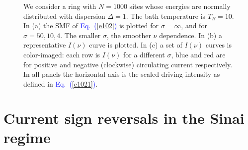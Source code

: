 \documentclass[aps,pre,floats,floatfix,twocolumn]{revtex4}
\newcommand{\Eq}[1]{\textcolor{blue}{Eq.\!\!~(\ref{#1})}}
\begin{document}
\begin{figure}
\caption{
We consider a ring with ${N=1000}$ sites whose energies 
are normally distributed with dispersion ${\Delta=1}$.
The bath temperature is $T_B=10$. 
In (a) the SMF of \Eq{e102} is plotted for $\sigma=\infty$, 
and for $\sigma=50,10,4$. The smaller $\sigma$, 
the smoother $\nu$ dependence.
In (b) a representative $I(\nu)$ curve is plotted.
In (c) a set of $I(\nu)$ curves is color-imaged:
each row is $I(\nu)$ for a different $\sigma$,  
blue and red are for positive and negative (clockwise) 
circulating current respectively.     
In all panels the horizontal axis is 
the scaled driving intensity as defined in \Eq{e1021}.} 
\label{f2}
\end{figure}







\section{Current sign reversals in the Sinai regime}
\label{sec:signchange}
\end{document}
